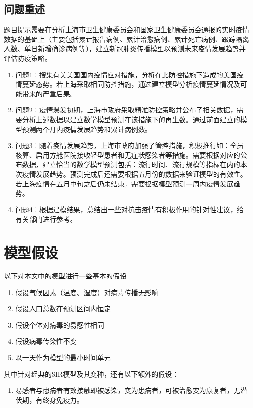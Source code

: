 \documentclass[bwprint]{gmcmthesis}
\numberwithin{figure}{section}
\begin{document}
\subsection{问题重述}
题目提示需要在分析上海市卫生健康委员会和国家卫生健康委员会通报的实时疫情数据的基础上（主要包括累计报告病例、累计治愈病例、累计死亡病例、跟踪隔离人数、单日新增确诊病例等），建立新冠肺炎传播模型以预测未来疫情发展趋势并评估防疫策略。
\begin{enumerate}
\item
问题1：搜集有关美国国内疫情应对措施，分析在此防控措施下造成的美国疫情蔓延态势。若上海采取相同防控措施，通过建立模型分析疫情蔓延情况及可能带来的严重后果。
\item 问题2：疫情爆发初期，上海市政府采取精准防控策略并公布了相关数据，需要分析上述数据以建立数学模型预测在该措施下的再生数。通过前面建立的模型预测两个月内疫情发展趋势和累计病例数。
\item 问题3：随着疫情发展趋势，上海市政府加强了管控措施，积极推行如：全员核算、启用方舱医院接收轻型患者和无症状感染者等措施。需要根据对应的公布数据，建立恰当的数学模型预测包括：流行时间、流行规模等指标在内的本次疫情发展趋势。预测完成后还需要根据五月份的数据来验证模型的有效性。若上海疫情在五月中旬之后仍未结束，需要根据模型预测一周内疫情发展趋势。
\item 问题4：根据建模结果，总结出一些对抗击疫情有积极作用的针对性建议，给有关部门进行参考。
\end{enumerate}



\section{模型假设}
\par 以下对本文中的模型进行一些基本的假设
\begin{enumerate}
\item 假设气候因素（温度、湿度）对病毒传播无影响
\item 假设人口总数在预测区间内恒定
\item 假设个体对病毒的易感性相同
\item 假设病毒传染性不变
\item 以一天作为模型的最小时间单元
\end{enumerate}

\par 其中针对经典的SIR模型及其变种，还有以下额外的假设：
\begin{enumerate}
    \item 易感者与患病者有效接触即被感染，变为患病者，可被治愈变为康复者，无潜伏期，有终身免疫力。
\end{enumerate}
    
\end{document}
